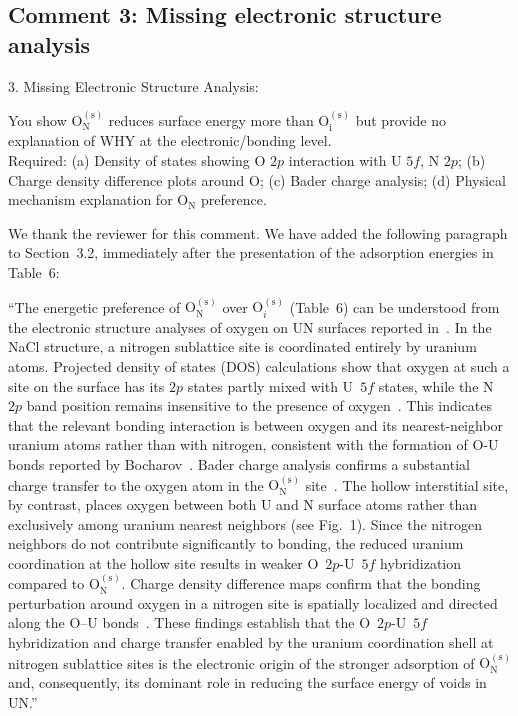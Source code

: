 \documentclass[12pt]{article}
\begin{document}
\subsection*{Comment 3: Missing electronic structure analysis}

\color{blue}

3. Missing Electronic Structure Analysis:

You show $\mathrm{O_N^{(s)}}$ reduces surface energy more than $\mathrm{O_i^{(s)}}$ but provide no explanation of WHY at the electronic/bonding level.
\\

Required: (a) Density of states showing O $2p$ interaction with U $5f$, N $2p$; (b) Charge density difference plots around O; (c) Bader charge analysis; (d) Physical mechanism explanation for $\mathrm{O_N}$ preference.
\\

\color{black}


We thank the reviewer for this comment. We have added the following paragraph to Section~3.2, immediately after the presentation of the adsorption energies in Table~6:

\color{red}


``The energetic preference of $\mathrm{O_N^{(s)}}$ over $\mathrm{O}_i^{\mathrm{(s)}}$ (Table~6) can be understood from the electronic structure analyses of oxygen on UN surfaces reported in~\cite{Bocharov2011JNM, Zhukovskii2009SS, Zhukovskii2009JNM}. In the NaCl structure, a nitrogen sublattice site is coordinated entirely by uranium atoms. Projected density of states (DOS) calculations show that oxygen at such a site on the surface has its $2p$ states partly mixed with U~$5f$ states, while the N~$2p$ band position remains insensitive to the presence of oxygen~\cite{Bocharov2011JNM,Zhukovskii2009JNM}. This indicates that the relevant bonding interaction is between oxygen and its nearest-neighbor uranium atoms rather than with nitrogen, consistent with the formation of O-U bonds reported by Bocharov~\cite{Bocharov2011JNM}. Bader charge analysis confirms a substantial charge transfer to the oxygen atom in the $\mathrm{O_N^{(s)}}$ site~\cite{Bocharov2011JNM}. The hollow interstitial site, by contrast, places oxygen between both U and N surface atoms rather than exclusively among uranium nearest neighbors (see Fig.~1). Since the nitrogen neighbors do not contribute significantly to bonding, the reduced uranium coordination at the hollow site results in weaker O~$2p$-U~$5f$ hybridization compared to $\mathrm{O_N^{(s)}}$. Charge density difference maps confirm that the bonding perturbation around oxygen in a nitrogen site is spatially localized and directed along the O--U bonds~\cite{Bocharov2011JNM}. These findings establish that the O~$2p$-U~$5f$ hybridization and charge transfer enabled by the uranium coordination shell at nitrogen sublattice sites is the electronic origin of the stronger adsorption of $\mathrm{O_N^{(s)}}$ and, consequently, its dominant role in reducing the surface energy of voids in UN.''
\\
\end{document}
